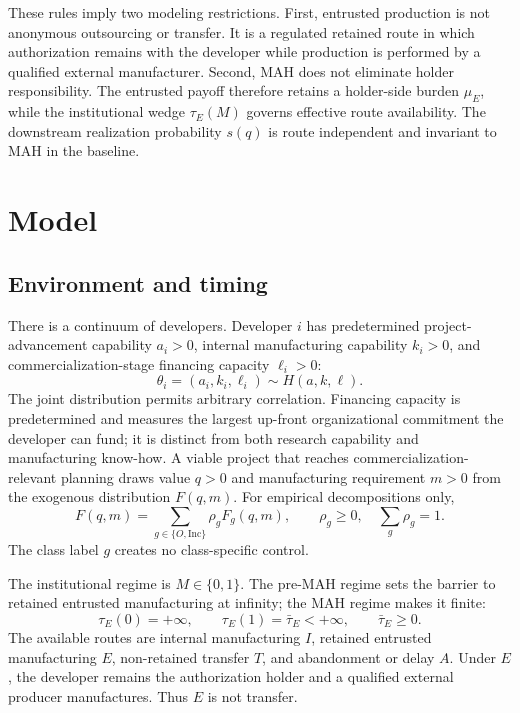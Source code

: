 \documentclass[12pt]{article}
\newcommand{\1}{\mathbf{1}}
\begin{document}
These rules imply two modeling restrictions. First, entrusted production is
not anonymous outsourcing or transfer. It is a regulated retained route in
which authorization remains with the developer while production is performed
by a qualified external manufacturer. Second, MAH does not eliminate holder
responsibility. The entrusted payoff therefore retains a holder-side burden
\(\mu_E\), while the institutional wedge \(\tau_E(M)\) governs effective
route availability. The downstream realization probability \(s(q)\) is
route independent and invariant to MAH in the baseline.

\section{Model}
\label{sec:p16m-model}

\subsection{Environment and timing}
\label{subsec:p16m-environment}

There is a continuum of developers. Developer \(i\) has predetermined
project-advancement capability \(a_i>0\), internal manufacturing capability
\(k_i>0\), and commercialization-stage financing capacity \(\ell_i>0\):
\begin{equation}
  \theta_i=(a_i,k_i,\ell_i)\sim H(a,k,\ell).
  \label{eq:p16m-developer-type}
\end{equation}
The joint distribution permits arbitrary correlation. Financing capacity is
predetermined and measures the largest up-front organizational commitment the
developer can fund; it is distinct from both research capability and
manufacturing know-how. A viable project that reaches
commercialization-relevant planning draws value \(q>0\) and manufacturing
requirement \(m>0\) from the exogenous distribution \(F(q,m)\). For empirical
decompositions only,
\[
  F(q,m)=\sum_{g\in\{O,\mathrm{Inc}\}}\rho_gF_g(q,m),
  \qquad
  \rho_g\geq0,\quad \sum_g\rho_g=1.
\]
The class label \(g\) creates no class-specific control.

The institutional regime is \(M\in\{0,1\}\). The pre-MAH regime sets the
barrier to retained entrusted manufacturing at infinity; the MAH regime
makes it finite:
\begin{equation}
  \tau_E(0)=+\infty,
  \qquad
  \tau_E(1)=\bar\tau_E<+\infty,
  \qquad \bar\tau_E\geq0.
  \label{eq:p16m-policy}
\end{equation}
The available routes are internal manufacturing \(I\), retained entrusted
manufacturing \(E\), non-retained transfer \(T\), and abandonment or delay
\(A\). Under \(E\), the developer remains the authorization holder and a
qualified external producer manufactures. Thus \(E\) is not transfer.
\end{document}
